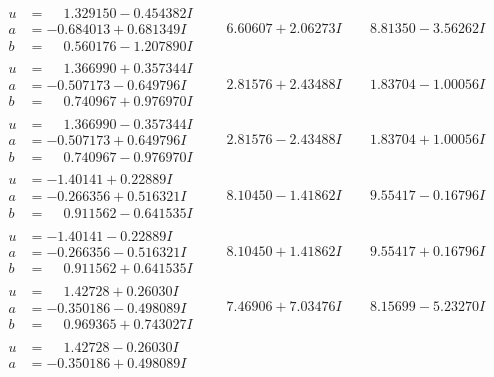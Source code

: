 \documentclass[1p]{elsarticle_modified}
\theoremstyle{definition}
\begin{document}
$$\begin{array}{c|c|c}
\begin{aligned}
u &= \phantom{-}1.329150 - 0.454382 I \\
a &= -0.684013 + 0.681349 I \\
b &= \phantom{-}0.560176 - 1.207890 I\end{aligned}
 & \phantom{-}6.60607 + 2.06273 I & \phantom{-}8.81350 - 3.56262 I \\ \hline\begin{aligned}
u &= \phantom{-}1.366990 + 0.357344 I \\
a &= -0.507173 - 0.649796 I \\
b &= \phantom{-}0.740967 + 0.976970 I\end{aligned}
 & \phantom{-}2.81576 + 2.43488 I & \phantom{-}1.83704 - 1.00056 I \\ \hline\begin{aligned}
u &= \phantom{-}1.366990 - 0.357344 I \\
a &= -0.507173 + 0.649796 I \\
b &= \phantom{-}0.740967 - 0.976970 I\end{aligned}
 & \phantom{-}2.81576 - 2.43488 I & \phantom{-}1.83704 + 1.00056 I \\ \hline\begin{aligned}
u &= -1.40141 + 0.22889 I \\
a &= -0.266356 + 0.516321 I \\
b &= \phantom{-}0.911562 - 0.641535 I\end{aligned}
 & \phantom{-}8.10450 - 1.41862 I & \phantom{-}9.55417 - 0.16796 I \\ \hline\begin{aligned}
u &= -1.40141 - 0.22889 I \\
a &= -0.266356 - 0.516321 I \\
b &= \phantom{-}0.911562 + 0.641535 I\end{aligned}
 & \phantom{-}8.10450 + 1.41862 I & \phantom{-}9.55417 + 0.16796 I \\ \hline\begin{aligned}
u &= \phantom{-}1.42728 + 0.26030 I \\
a &= -0.350186 - 0.498089 I \\
b &= \phantom{-}0.969365 + 0.743027 I\end{aligned}
 & \phantom{-}7.46906 + 7.03476 I & \phantom{-}8.15699 - 5.23270 I \\ \hline\begin{aligned}
u &= \phantom{-}1.42728 - 0.26030 I \\
a &= -0.350186 + 0.498089 I \\

\end{aligned}
\end{array}$$
\end{document}
